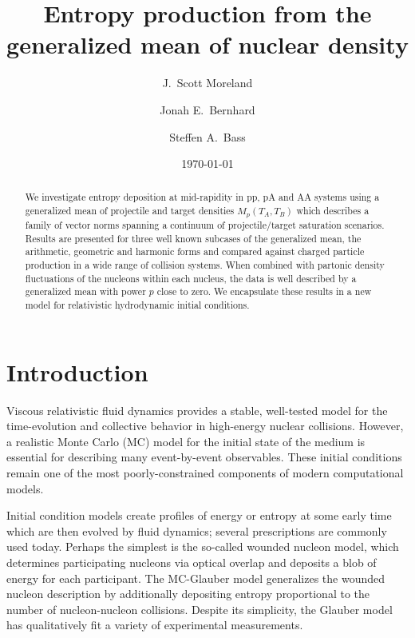 \documentclass[aps,prl,reprint,amsmath,nofootinbib]{revtex4-1}
\begin{document}
\title{Entropy production from the generalized mean of nuclear density}

\author{J.\ Scott Moreland}
\author{Jonah E.\ Bernhard}
\author{Steffen A.\ Bass}

\date{\today}


\begin{abstract}
  We investigate entropy deposition at mid-rapidity in pp, pA and AA systems using a generalized mean of
  projectile and target densities $M_p(T_A,T_B)$ which describes a family of vector norms spanning a continuum
  of projectile/target saturation scenarios.  Results are presented for three well known subcases of the
  generalized mean, the arithmetic, geometric and harmonic forms and compared against charged particle
  production in a wide range of collision systems. When combined with partonic density fluctuations of the
  nucleons within each nucleus, the data is well described by a generalized mean with power $p$ close to zero.
  We encapsulate these results in a new model for relativistic hydrodynamic initial conditions.
\end{abstract}


\maketitle

\section{Introduction}

Viscous relativistic fluid dynamics provides a stable, well-tested model for the time-evolution and collective
behavior in high-energy nuclear collisions.  However, a realistic Monte Carlo (MC) model for the initial state
of the medium is essential for describing many event-by-event observables.  These initial conditions remain
one of the most poorly-constrained components of modern computational models.

Initial condition models create profiles of energy or entropy at some early time which are then evolved by
fluid dynamics; several prescriptions are commonly used today.  Perhaps the simplest is the so-called wounded
nucleon model, which determines participating nucleons via optical overlap and deposits a blob of energy for
each participant.  The MC-Glauber model generalizes the wounded nucleon description by additionally depositing
entropy proportional to the number of nucleon-nucleon collisions.  Despite its simplicity, the Glauber model
has qualitatively fit a variety of experimental measurements.
\end{document}
